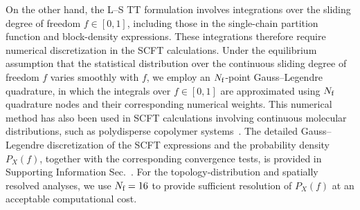 On the other hand, the L--S TT formulation involves integrations over the sliding degree of freedom $f\in[0,1]$, including those in the single-chain partition function and block-density expressions.
These integrations therefore require numerical discretization in the SCFT calculations.
Under the equilibrium assumption that the statistical distribution over the continuous sliding degree of freedom $f$ varies smoothly with $f$, we employ an $N_{\text f}$-point Gauss--Legendre quadrature, in which the integrals over $f\in[0,1]$ are approximated using $N_{\text f}$ quadrature nodes and their corresponding numerical weights.
This numerical method has also been used in SCFT calculations involving continuous molecular distributions, such as polydisperse copolymer systems~\cite{Sides2004Continuous}.
The detailed Gauss--Legendre discretization of the SCFT expressions and the probability density $P_X(f)$, together with the corresponding convergence tests, is provided in Supporting Information Sec.~.
For the topology-distribution and spatially resolved analyses, we use $N_{\text f}=16$ to provide sufficient resolution of $P_X(f)$ at an acceptable computational cost.
